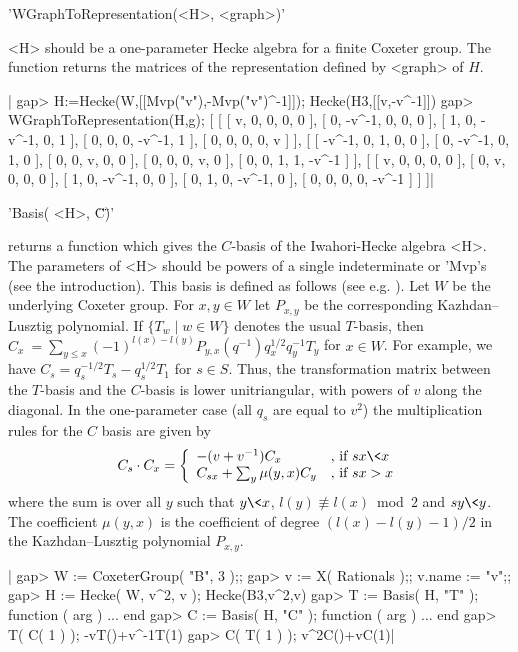 'WGraphToRepresentation(<H>, <graph>)'

<H> should be a one-parameter Hecke algebra for a finite Coxeter group. The
function  returns the matrices of the  representation defined by <graph> of
$H$.

|    gap> H:=Hecke(W,[[Mvp("v"),-Mvp("v")^-1]]);
    Hecke(H3,[[v,-v^-1]])
    gap> WGraphToRepresentation(H,g);
    [ [ [ v, 0, 0, 0, 0 ], [ 0, -v^-1, 0, 0, 0 ], [ 1, 0, -v^-1, 0, 1 ],
          [ 0, 0, 0, -v^-1, 1 ], [ 0, 0, 0, 0, v ] ],
      [ [ -v^-1, 0, 1, 0, 0 ], [ 0, -v^-1, 0, 1, 0 ], [ 0, 0, v, 0, 0 ],
          [ 0, 0, 0, v, 0 ], [ 0, 0, 1, 1, -v^-1 ] ],
      [ [ v, 0, 0, 0, 0 ], [ 0, v, 0, 0, 0 ], [ 1, 0, -v^-1, 0, 0 ],
          [ 0, 1, 0, -v^-1, 0 ], [ 0, 0, 0, 0, -v^-1 ] ] ]|


'Basis( <H>, \"C\" )'

returns  a function which gives the  $C$-basis of the Iwahori-Hecke algebra
<H>.  The parameters of <H>  should be powers of  a single indeterminate or
'Mvp's  (see the introduction). This basis  is defined as follows (see e.g.
\cite[(5.1)]{Lus85}). Let $W$ be the underlying Coxeter group. For $x,y \in
W$  let  $P_{x,y}$  be  the  corresponding  Kazhdan--Lusztig polynomial. If
$\{T_w  \mid w\in W\}$ denotes the usual $T$-basis, then $C_x\:=\sum_{y \le
x} (-1)^{l(x)-l(y)}P_{y,x}(q^{-1})q_x^{1/2}q_y^{-1} T_y$ for $x \in W$. For
example,  we have $C_s=q_s^{-1/2}T_s-q_s^{1/2}T_1$ for $s \in S$. Thus, the
transformation  matrix  between  the  $T$-basis  and the $C$-basis is lower
unitriangular,  with powers of $v$ along the diagonal. In the one-parameter
case  (all $q_s$ are equal  to $v^2$) the multiplication  rules for the $C$
basis   are  given  by\:  $$   C_s  \cdot  C_x  =\left\{  \begin{array}{ll}
-(v+v^{-1})C_x  &  \mbox{,  if  $sx\<x$}\\  C_{sx}+\sum_{y}  \mu(y,x)C_y  &
\mbox{,  if $sx>x$}\end{array}\right.$$ where the sum  is over all $y$ such
that  $y\<x$, $l(y)  \not\equiv l(x)$~mod~$2$  and $sy\<y$. The coefficient
$\mu(y,x)$   is  the   coefficient  of   degree  $(l(x)-l(y)-1)/2$  in  the
Kazhdan--Lusztig polynomial $P_{x,y}$.

|    gap> W := CoxeterGroup( "B", 3 );;
    gap> v := X( Rationals );; v.name := "v";;
    gap> H := Hecke( W, v^2, v );
    Hecke(B3,v^2,v)
    gap> T := Basis( H, "T" );
    function ( arg ) ... end
    gap> C := Basis( H, "C" );
    function ( arg ) ... end
    gap> T( C( 1 ) );
    -vT()+v^-1T(1)
    gap> C( T( 1 ) );
    v^2C()+vC(1)|

